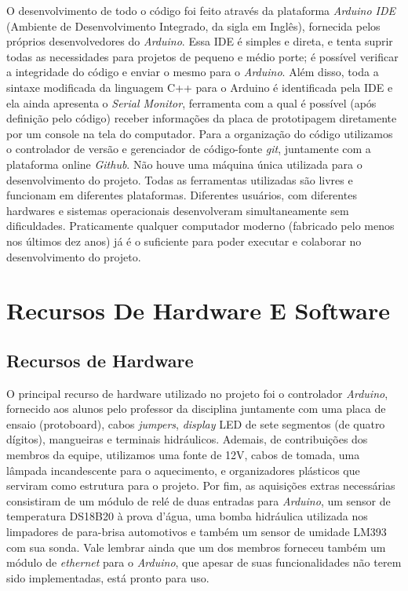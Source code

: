 \documentclass[a4paper,12pt]{article}
\begin{document}
O desenvolvimento de todo o código foi feito através da plataforma \textit{Arduino IDE} (Ambiente de Desenvolvimento Integrado, da sigla em Inglês), fornecida pelos próprios desenvolvedores do \textit{Arduino}. Essa IDE é simples e direta, e tenta suprir todas as necessidades para projetos de pequeno e médio porte; é possível verificar a integridade do código e enviar o mesmo para o \textit{Arduino}. Além disso, toda a sintaxe modificada da linguagem C++ para o Arduino é identificada pela IDE e ela ainda apresenta o \textit{Serial Monitor}, ferramenta com a qual é possível (após definição pelo código) receber informações da placa de prototipagem diretamente por um console na tela do computador. Para a organização do código utilizamos o controlador de versão e gerenciador de código-fonte \textit{git}, juntamente com a plataforma online \textit{Github}. Não houve uma máquina única utilizada para o desenvolvimento do projeto. Todas as ferramentas utilizadas são livres e funcionam em diferentes plataformas. Diferentes usuários, com diferentes hardwares e sistemas operacionais desenvolveram simultaneamente sem dificuldades. Praticamente qualquer computador moderno (fabricado pelo menos nos últimos dez anos) já é o suficiente para poder executar e colaborar no desenvolvimento do projeto.



\section{Recursos De Hardware E Software}
\subsection{Recursos de Hardware}

O principal recurso de hardware utilizado no projeto foi o controlador \textit{Arduino}, fornecido aos alunos pelo professor da disciplina juntamente com uma placa de ensaio (protoboard), cabos \textit{jumpers}, \textit{display} LED de sete segmentos (de quatro dígitos), mangueiras e terminais hidráulicos. Ademais, de contribuições dos membros da equipe, utilizamos uma fonte de 12V, cabos de tomada, uma lâmpada incandescente para o aquecimento,  e organizadores plásticos que serviram como estrutura para o projeto. Por fim, as aquisições extras necessárias consistiram de um módulo de relé de duas entradas para \textit{Arduino}, um sensor de temperatura DS18B20 à prova d’água, uma bomba hidráulica utilizada nos limpadores de para-brisa automotivos e também um sensor de umidade LM393 com sua sonda. Vale lembrar ainda que um dos membros forneceu também um módulo de \textit{ethernet} para o \textit{Arduino}, que apesar de suas funcionalidades não terem sido implementadas, está pronto para uso.\cite{igoe2007making}
\end{document}

